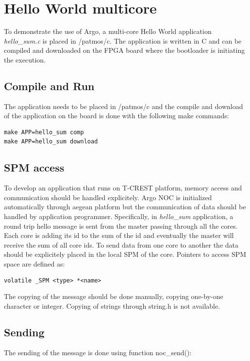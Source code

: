 \documentclass[a4paper,fontsize=10pt,twoside,DIV15,BCOR12mm,headinclude=true,footinclude=false,pagesize,bibtotoc]{scrbook}
\begin{document}
\section{Hello World multicore}

To demonstrate the use of Argo, a multi-core Hello World application \textit{hello\_sum.c} is placed in /patmos/c.
The application is written in C and can be compiled and downloaded on the FPGA board where the bootloader is initiating the execution.

\subsection{Compile and Run}
The application needs to be placed in /patmos/c and the compile and download of the application on the board is done with the following make commands:

\begin{verbatim}
make APP=hello_sum comp
make APP=hello_sum download
\end{verbatim}

\subsection{SPM access}
To develop an application that runs on T-CREST platform, memory access and 
communication should be handled explicitely. Argo NOC is initialized automatically 
through aegean platform but the communication of data should be handled by application programmer.
Specifically, in \textit{hello\_sum} application, a round trip hello message is sent from the master
passing through all the cores. Each core is adding its id to the sum of the id and 
eventually the master will receive the sum of all core ids. To send data from one core to another 
the data should be explicitely placed in the local SPM of the core. Pointers to access SPM space are defined as:

\begin{lstlisting}
volatile _SPM <type> *<name>
\end{lstlisting}

The copying of the message should be done manually, copying one-by-one character or integer.
Copying of strings through string.h is not available. 


\subsection{Sending}
The sending of the message is done using function noc\_send():
\end{document}
